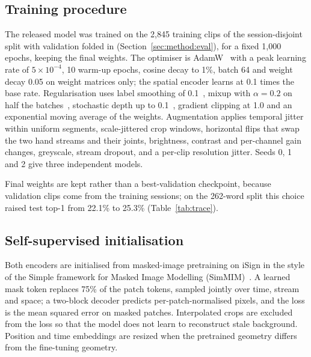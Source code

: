 \documentclass[pdflatex,sn-mathphys-num,twocolumn]{sn-jnl}
\theoremstyle{thmstyleone}%
\begin{document}
\subsection{Training procedure}\label{sec:method:train}
The released model was trained on the 2,845 training clips of the session-disjoint split with validation folded in (Section~\ref{sec:method:eval}), for a fixed 1,000 epochs, keeping the final weights. The optimiser is AdamW~\cite{loshchilov2019adamw} with a peak learning rate of $5\times10^{-4}$, 10 warm-up epochs, cosine decay to 1\%, batch 64 and weight decay 0.05 on weight matrices only; the spatial encoder learns at 0.1 times the base rate. Regularisation uses label smoothing of 0.1~\cite{szegedy2016inception}, mixup with $\alpha=0.2$ on half the batches~\cite{zhang2018mixup}, stochastic depth up to 0.1~\cite{huang2016stochdepth}, gradient clipping at 1.0 and an exponential moving average of the weights. Augmentation applies temporal jitter within uniform segments, scale-jittered crop windows, horizontal flips that swap the two hand streams and their joints, brightness, contrast and per-channel gain changes, greyscale, stream dropout, and a per-clip resolution jitter. Seeds 0, 1 and 2 give three independent models.

Final weights are kept rather than a best-validation checkpoint, because validation clips come from the training sessions; on the 262-word split this choice raised test top-1 from 22.1\% to 25.3\% (Table~\ref{tab:trace}).

\subsection{Self-supervised initialisation}\label{sec:method:ssl}
Both encoders are initialised from masked-image pretraining on iSign in the style of the Simple framework for Masked Image Modelling (SimMIM)~\cite{xie2022simmim}. A learned mask token replaces 75\% of the patch tokens, sampled jointly over time, stream and space; a two-block decoder predicts per-patch-normalised pixels, and the loss is the mean squared error on masked patches. Interpolated crops are excluded from the loss so that the model does not learn to reconstruct stale background. Position and time embeddings are resized when the pretrained geometry differs from the fine-tuning geometry.
\end{document}
